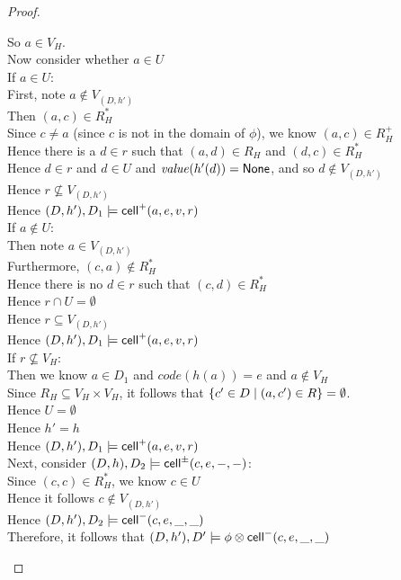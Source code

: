 \begin{proof}
\begin{tabbedproof}
\ooooo So $a \in V_H$. \\
\ooooo Now consider whether $a \in U$ \\
\ooooo If $a \in U$: \\
\oooooo First, note $a \not\in V_{(D,h')}$ \\
\oooooo Then $(a, c) \in R^*_H$ \\
\oooooo Since $c \not= a$ (since $c$ is not in the domain of $\phi$), we know $(a, c) \in R^+_H$ \\
\oooooo Hence there is a $d \in r$ such that $(a,d) \in R_H$ and $(d, c) \in R^*_H$  \\
\oooooo Hence $d \in r$ and $d \in U$ and $\mathit{value}(h'(d)) = \mathsf{None}$, and so $d \not\in V_{(D,h')}$\\
\oooooo Hence $r \not\subseteq V_{(D, h')}$ \\
\oooooo Hence $(D,h'), D_1 \models \mathsf{cell}^{+}({a}, {e}, {v}, {r})$ \\
\ooooo If $a \not\in U$: \\
\oooooo Then note $a \in V_{(D,h')}$ \\
\oooooo Furthermore, $(c, a) \not\in R^*_H$ \\
\oooooo Hence there is no $d \in r$ such that $(c, d) \in R^*_H$  \\
\oooooo Hence $r \cap U = \emptyset$ \\
\oooooo Hence $r \subseteq V_{(D,h')}$ \\
\oooooo Hence $(D,h'), D_1 \models \mathsf{cell}^{+}({a}, {e}, {v}, {r})$ \\
\oooo If $r \not\subseteq V_H$: \\
\ooooo Then we know $a \in D_1$ and $\mathit{code}(h(a)) = e$ and $a \not\in V_H$  \\
\ooooo Since $R_H \subseteq V_H \times V_H$, it follows that $\{{{c'\in D}\;|\;{(a,c') \in R}}\} = \emptyset$. \\
\ooooo Hence $U = \emptyset$ \\
\ooooo Hence $h' = h$ \\
\ooooo Hence $(D,h'), D_1 \models \mathsf{cell}^{+}({a}, {e}, {v}, {r})$ \\
\oo Next, consider $(D,h), D_2 \models \mathsf{cell}^{\pm}({c}, {e}, {-}, {-})$: \\
\ooo Since $(c, c) \in R^*_H$,  we know $c \in U$ \\
\ooo Hence it follows $c \not\in V_{(D, h')}$ \\
\ooo Hence $(D,h'), D_2 \models \mathsf{cell}^{-}({c}, {e}, {\_}, {\_})$ \\
\oo Therefore, it follows that $(D,h'), D' \models \phi \otimes \mathsf{cell}^{-}({c}, {e}, {\_}, {\_})$ \\ 
\end{tabbedproof}
\end{proof}


